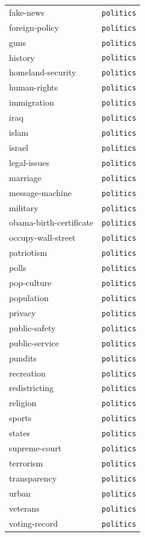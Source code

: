 \begin{longtable}{ll}
fake-news & \texttt{politics} \\
foreign-policy & \texttt{politics} \\
guns & \texttt{politics} \\
history & \texttt{politics} \\
homeland-security & \texttt{politics} \\
human-rights & \texttt{politics} \\
immigration & \texttt{politics} \\
iraq & \texttt{politics} \\
islam & \texttt{politics} \\
israel & \texttt{politics} \\
legal-issues & \texttt{politics} \\
marriage & \texttt{politics} \\
message-machine & \texttt{politics} \\
military & \texttt{politics} \\
obama-birth-certificate & \texttt{politics} \\
occupy-wall-street & \texttt{politics} \\
patriotism & \texttt{politics} \\
polls & \texttt{politics} \\
pop-culture & \texttt{politics} \\
population & \texttt{politics} \\
privacy & \texttt{politics} \\
public-safety & \texttt{politics} \\
public-service & \texttt{politics} \\
pundits & \texttt{politics} \\
recreation & \texttt{politics} \\
redistricting & \texttt{politics} \\
religion & \texttt{politics} \\
sports & \texttt{politics} \\
states & \texttt{politics} \\
supreme-court & \texttt{politics} \\
terrorism & \texttt{politics} \\
transparency & \texttt{politics} \\
urban & \texttt{politics} \\
veterans & \texttt{politics} \\
voting-record & \texttt{politics} \\
\end{longtable}


